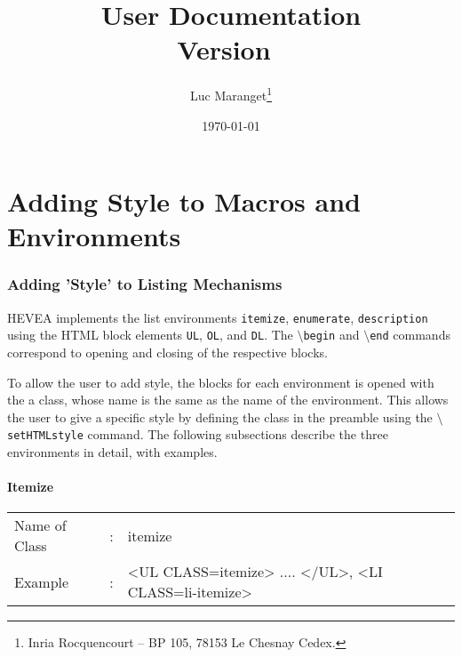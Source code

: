 \documentclass {article}
\title{\hevea{} User Documentation\\
{\normalsize Version~\heveaversion}}
\author{Luc Maranget\thanks{Inria Rocquencourt -- BP 105, 78153 Le
Chesnay Cedex. {\tt \mailto{Luc.Maranget@inria.fr}}}}
\date{\today}
\begin{document}
\maketitle

\part{Adding Style to Macros and Environments}

\section {Adding 'Style' to Listing Mechanisms}
HEVEA implements the list environments \texttt{itemize}, \texttt{enumerate}, \texttt{description} using the HTML block elements \texttt{UL}, \texttt{OL}, and \texttt{DL}. The \texttt{$\setminus$begin} and \texttt{$\setminus$end} commands correspond to opening and closing of the respective blocks. 

To allow the user to add style, the blocks for each environment is opened with the a class, whose name is the same as the name of the environment. This allows the user to give a specific style by defining the class in the preamble using the \texttt{$\setminus$setHTMLstyle} command. The following subsections describe the three environments in detail, with examples. 

\subsection{Itemize}
\begin{tabular}{lll}
Name of Class & : & itemize\\
Example & : & <UL CLASS=itemize> .... </UL>, <LI CLASS=li-itemize>\\
\end{tabular}
\end{document}
